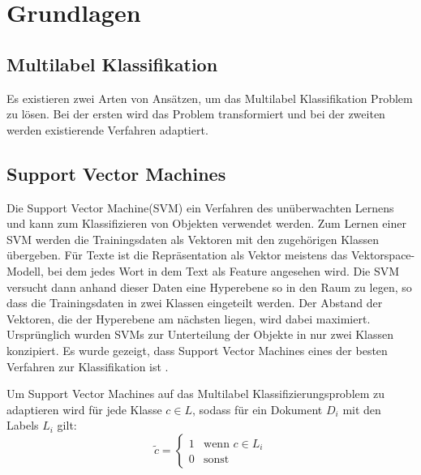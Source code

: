 \section{Grundlagen}
\subsection{Multilabel Klassifikation}
\label{sub:multilabel_klassifikation}
Es existieren zwei Arten von Ansätzen, um das Multilabel Klassifikation Problem zu lösen.
Bei der ersten wird das Problem transformiert und bei der zweiten werden existierende Verfahren adaptiert.

\subsection{Support Vector Machines}
\label{sub:support_vector_machines}
Die  Support Vector Machine(SVM) ein Verfahren des unüberwachten Lernens und kann zum Klassifizieren von Objekten verwendet werden.
Zum Lernen einer SVM werden die Trainingsdaten als Vektoren mit den zugehörigen Klassen übergeben.
Für Texte ist die Repräsentation als Vektor meistens das Vektorspace-Modell, bei dem jedes Wort in dem Text als Feature angesehen wird.
Die SVM versucht dann anhand dieser Daten eine Hyperebene so in den Raum zu legen, so dass die Trainingsdaten in zwei Klassen eingeteilt werden.
Der Abstand der Vektoren, die der Hyperebene am nächsten liegen, wird dabei maximiert.
Ursprünglich wurden SVMs zur Unterteilung der Objekte in nur zwei Klassen konzipiert.
Es wurde gezeigt, dass Support Vector Machines eines der besten Verfahren zur Klassifikation ist \cite{Joachims:1998:TCS:645326.649721}.







Um Support Vector Machines auf das Multilabel Klassifizierungsproblem zu adaptieren wird für jede Klasse $c \in L$, sodass für ein Dokument $D_i$ mit den Labels $L_i$ gilt:
\[
    \tilde c =
    \begin{cases}
        1 &\mbox{wenn } c \in L_i \\
        0 &\mbox{sonst}
    \end{cases}
\]

